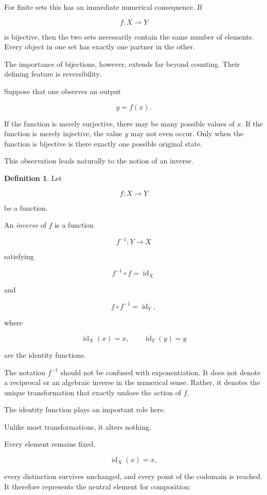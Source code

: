 \documentclass[11pt]{book}
\numberwithin{equation}{chapter}
\theoremstyle{definition}
\newtheorem{definition}{Definition}[chapter]
\theoremstyle{plain}
\theoremstyle{remark}
\DeclareMathOperator{\id}{id}
\begin{document}
For finite sets this has an immediate numerical consequence. If

\[
f:X\rightarrow Y
\]

is bijective, then the two sets necessarily contain the same number of elements. Every object in one set has exactly one partner in the other.

The importance of bijections, however, extends far beyond counting. Their defining feature is reversibility.

Suppose that one observes an output

\[
y=f(x).
\]

If the function is merely surjective, there may be many possible values of \(x\). If the function is merely injective, the value \(y\) may not even occur. Only when the function is bijective is there exactly one possible original state.

This observation leads naturally to the notion of an inverse.

\begin{definition}
Let

\[
f:X\rightarrow Y
\]

be a function.

An \emph{inverse} of \(f\) is a function

\[
f^{-1}:Y\rightarrow X
\]

satisfying

\[
f^{-1}\circ f=\id_X
\]

and

\[
f\circ f^{-1}=\id_Y,
\]

where

\[
\id_X(x)=x,
\qquad
\id_Y(y)=y
\]

are the identity functions.
\end{definition}

The notation \(f^{-1}\) should not be confused with exponentiation. It does not denote a reciprocal or an algebraic inverse in the numerical sense. Rather, it denotes the unique transformation that exactly undoes the action of \(f\).

The identity function plays an important role here.

Unlike most transformations, it alters nothing.

Every element remains fixed,

\[
\id_X(x)=x,
\]

every distinction survives unchanged, and every point of the codomain is reached. It therefore represents the neutral element for composition:
\end{document}
